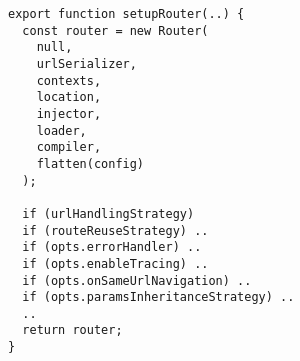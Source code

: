 \begin{verbatim}
export function setupRouter(..) {
  const router = new Router(
    null,
    urlSerializer,
    contexts,
    location,
    injector,
    loader,
    compiler,
    flatten(config)
  );

  if (urlHandlingStrategy)
  if (routeReuseStrategy) ..
  if (opts.errorHandler) ..
  if (opts.enableTracing) ..
  if (opts.onSameUrlNavigation) ..
  if (opts.paramsInheritanceStrategy) ..
  ..
  return router;
}
\end{verbatim}
